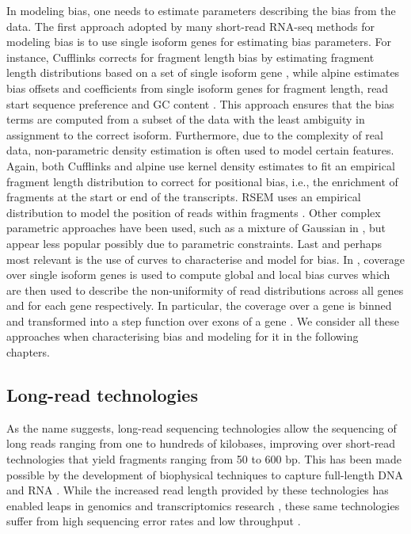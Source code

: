 In modeling bias, one needs to estimate parameters describing the bias from the data. The first approach adopted by many short-read RNA-seq methods for modeling bias is to use single isoform genes for estimating bias parameters. For instance, 
Cufflinks corrects for fragment length bias by estimating fragment length distributions based on a set of single isoform gene \cite{Roberts2011}, while alpine  estimates bias offsets and coefficients from single isoform genes for fragment length, read start sequence preference and GC content \cite{Love2016}. This approach ensures that the bias terms are computed from a subset of the data with the least ambiguity in assignment to the correct isoform. Furthermore, due to the complexity of real data, non-parametric density estimation is often used to model certain features. Again, both Cufflinks and alpine use kernel density estimates to fit an empirical fragment length distribution to correct for positional bias, i.e., the enrichment of fragments at the start or end of the transcripts. RSEM uses an empirical distribution to model the position of reads within fragments \cite{Li2011}. Other complex parametric approaches have been used, such as a mixture of Gaussian in \cite{MIXMIX}, but appear less popular possibly due to parametric constraints. Last and perhaps most relevant is the use of curves to characterise and model for bias. In \cite{NURD}, coverage over single isoform genes is used to compute global and local bias curves which are then used to describe the non-uniformity of read distributions across all genes and for each gene respectively. In particular, the coverage over a gene is binned and transformed into a step function over exons of a gene \cite{NURD}. We consider all these approaches when characterising bias and modeling for it in the following chapters. 

\subsection{Long-read technologies}

As the name suggests, long-read sequencing technologies allow the sequencing of long reads ranging from one to hundreds of kilobases, improving over short-read technologies that yield fragments ranging from 50 to 600 bp. This has been made possible by the development of biophysical techniques to capture full-length DNA and RNA \cite{Weirather2017}. While the increased read length provided by these technologies has enabled leaps in genomics and transcriptomics research \cite{Bolisetty2015, Byrne2017, DeCoster2019, Liu2019, Mantere2019, Nurk2021}, these same technologies suffer from high sequencing error rates and low throughput \cite{Carneiro2012, Reuter2015, Jain2015}.  

